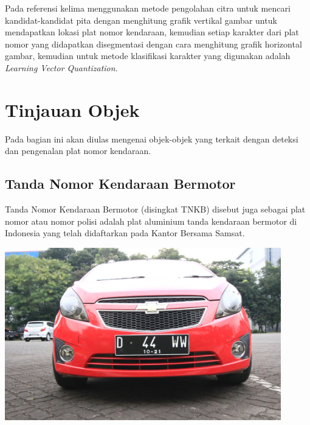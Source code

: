 \noindent Pada referensi kelima \cite{nugroho} menggunakan metode pengolahan citra untuk mencari kandidat-kandidat pita dengan menghitung grafik vertikal gambar untuk mendapatkan lokasi plat nomor kendaraan, kemudian setiap karakter dari plat nomor yang didapatkan disegmentasi dengan cara menghitung grafik horizontal gambar, kemudian untuk metode klasifikasi karakter yang digunakan adalah \textit{Learning Vector Quantization}.\\

\section{Tinjauan Objek}
\noindent Pada bagian ini akan diulas mengenai objek-objek yang terkait dengan deteksi dan pengenalan plat nomor kendaraan.\\

\subsection{Tanda Nomor Kendaraan Bermotor}
\noindent Tanda Nomor Kendaraan Bermotor (disingkat TNKB) disebut juga sebagai plat nomor atau nomor polisi adalah plat aluminium tanda kendaraan bermotor di Indonesia yang telah didaftarkan pada Kantor Bersama Samsat.

\begin{adjustbox}{width=1\textwidth}
\noindent\begin{minipage}{\linewidth}
	\centering\includegraphics[width=12cm]{images/plat_nomor_example.png}
	\label{fig:ContohPlatNomorIndonesia}
\end{minipage}
\end{adjustbox}\\

